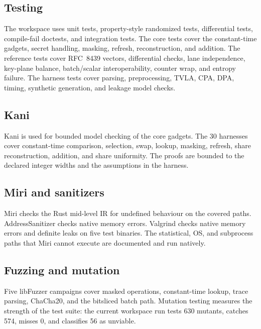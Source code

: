 \documentclass[11pt,a4paper]{article}
\theoremstyle{plain}
\theoremstyle{definition}
\theoremstyle{remark}
\begin{document}
\subsection{Testing}

The workspace uses unit tests, property-style randomized tests, differential tests,
compile-fail doctests, and integration tests. The core tests cover the constant-time
gadgets, secret handling, masking, refresh, reconstruction, and addition. The reference
tests cover RFC~8439 vectors, differential checks, lane independence, key-plane balance,
batch/scalar interoperability, counter wrap, and entropy failure. The harness tests
cover parsing, preprocessing, TVLA, CPA, DPA, timing, synthetic generation, and leakage
model checks.

\subsection{Kani}

Kani \citep{kani} is used for bounded model checking of the core gadgets. The 30
harnesses cover constant-time comparison, selection, swap, lookup, masking, refresh,
share reconstruction, addition, and share uniformity. The proofs are bounded to the
declared integer widths and the assumptions in the harness.

\subsection{Miri and sanitizers}

Miri \citep{miri} checks the Rust mid-level IR for undefined behaviour on the covered
paths. AddressSanitizer \citep{serebryany2012asan} checks native memory errors.
Valgrind \citep{nethercote2007valgrind} checks native memory errors and definite leaks
on five test binaries. The statistical, OS, and subprocess paths that Miri cannot
execute are documented and run natively.

\subsection{Fuzzing and mutation}

Five libFuzzer campaigns \citep{libfuzzer} cover masked operations, constant-time
lookup, trace parsing, ChaCha20, and the bitsliced batch path. Mutation testing
\citep{jia2011mutation} measures the strength of the test suite: the current workspace
run tests 630 mutants, catches 574, misses 0, and classifies 56 as unviable.
\end{document}

